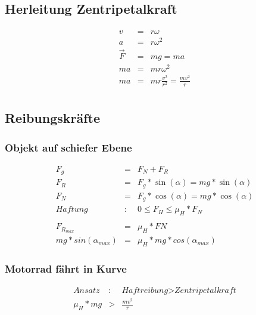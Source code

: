 \documentclass[11pt]{article}
\begin{document}
\subsection{Herleitung Zentripetalkraft}
\begin{eqnarray*}
v&=&r\omega\\
a&=&r\omega^2\\
\overrightarrow{F} &=& mg = ma\\
ma &=& mr\omega^2\\
ma &=& mr\frac{v^2}{r^2} = \frac{mv^2}{r}\\
\end{eqnarray*}
\subsection{Reibungskräfte}
\subsubsection{Objekt auf schiefer Ebene}
\begin{eqnarray*}
F_g &=& F_N + F_R\\
F_R &=& F_g * \sin(\alpha) = mg*\sin(\alpha)\\
F_N &=& F_g * \cos(\alpha) = mg*\cos(\alpha)\\
\textit{Haftung}&:& 0 \le F_H \le \mu_H * F_N\\\\
F_{R_{max}} &=& \mu_H * FN\\
mg * sin(\alpha_{max}) &=& \mu_H * mg * cos(\alpha_{max})
\end{eqnarray*}
\subsubsection{Motorrad fährt in Kurve}
\begin{eqnarray*}
\textit{Ansatz}&:& \textit{Haftreibung} > \textit{Zentripetalkraft}\\
\mu_H * mg &>& \frac{mv^2}{r}\\
\end{eqnarray*}
\end{document}
